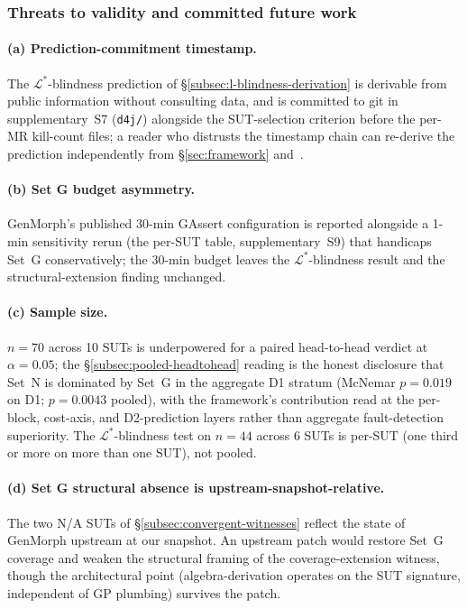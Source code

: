 \documentclass[manuscript]{acmart}
\begin{document}
\subsubsection{Threats to validity and committed future work}
\label{subsec:empirical-threats}

\paragraph{(a) Prediction-commitment timestamp.}
The $\mathcal{L}^{*}$-blindness prediction of \S\ref{subsec:l-blindness-derivation} is derivable from public information without consulting data, and is committed to git in supplementary~S7 (\texttt{d4j/}) alongside the SUT-selection criterion before the per-MR kill-count files; a reader who distrusts the timestamp chain can re-derive the prediction independently from \S\ref{sec:framework} and~\cite{Coles2016PIT}.

\paragraph{(b) Set G budget asymmetry.}
GenMorph's published 30-min GAssert configuration is reported alongside a 1-min sensitivity rerun (the per-SUT table, supplementary~S9) that handicaps Set~G conservatively; the 30-min budget leaves the $\mathcal{L}^{*}$-blindness result and the structural-extension finding unchanged.

\paragraph{(c) Sample size.}
$n = 70$ across 10 SUTs is underpowered for a paired head-to-head verdict at $\alpha = 0.05$; the \S\ref{subsec:pooled-headtohead} reading is the honest disclosure that Set~N is dominated by Set~G in the aggregate D1 stratum (McNemar $p = 0.019$ on D1; $p = 0.0043$ pooled), with the framework's contribution read at the per-block, cost-axis, and D2-prediction layers rather than aggregate fault-detection superiority. The $\mathcal{L}^{*}$-blindness test on $n = 44$ across 6 SUTs is per-SUT (one third or more on more than one SUT), not pooled.

\paragraph{(d) Set G structural absence is upstream-snapshot-relative.}
The two N/A SUTs of \S\ref{subsec:convergent-witnesses} reflect the state of GenMorph upstream at our snapshot. An upstream patch would restore Set~G coverage and weaken the structural framing of the coverage-extension witness, though the architectural point (algebra-derivation operates on the SUT signature, independent of GP plumbing) survives the patch.
\end{document}
